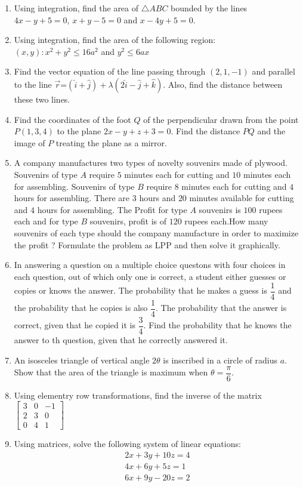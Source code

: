 \documentclass[12pt,-letter paper]{article}
\providecommand{\brak}[1]{\ensuremath{\left(#1\right)}}
\begin{document}
\begin{enumerate}
 \item Using integration, find the area of $\triangle ABC$ bounded by the lines $4x-y+5=0$, $x+y-5=0$ and $x-4y+5=0$.

\item Using integration, find the area of the following region:
       ${(x,y): x^2+y^2\leq 16a^2}$ and ${y^2 \leq 6ax}$	

\item Find the vector equation of the line passing through $\brak{2,1,-1}$ and parallel to the line $\overrightarrow{r}$=$\brak{\hat{i}+\hat{j}}+\lambda\brak{2\hat{i}-\hat{j}+\hat{k}}$. Also, find the distance between these two lines.
	
\item Find the coordinates of the foot $Q$ of the perpendicular drawn from the point $P\brak{1,3,4}$ to the plane $2x-y+z+3=0$. Find the distance $PQ$ and the image of $P$ treating the plane as a mirror.

\item A company manufactures two types of novelty souvenirs made of plywood. Souvenirs of type $A$ require $5$ minutes each for cutting and $10$ minutes each for assembling. Souvenirs of type $B$ require $8$ minutes each for cutting and $4$ hours for assembling. There are $3$ hours and $20$ minutes available for cutting and $4$ hours for assembling. The Profit for type $A$ souvenirs is $100$ rupees each and for type $B$ souvenirs, profit is of $120$ rupees each.How many souvenirs of each type should the company manufacture in order to maximize the profit ? Formulate the problem as LPP and then solve it graphically.

\item In answering a question on a multiple choice questons with four choices in each question, out of which only one is correct, a student either guesses or copies or knows the answer. The probability that he makes a guess is $\dfrac{1}{4}$ and the probability that he copies is also $\dfrac{1}{4}$. The probability that the answer is correct, given that he copied it is $\dfrac{3}{4}$. Find the probability that he knows the answer to th question, given that he correctly answered it.

\item An isosceles triangle of vertical angle $2\theta$ is inscribed in a circle  of radius $a$. Show that the area of the triangle is maximum when $\theta =\dfrac{\pi}{6}$.

\item Using elementry row transformations, find the inverse of the matrix
		$\begin{bmatrix}
			3 & 0 &-1\\
			2 & 3 & 0\\
			0 & 4 &1
		\end{bmatrix}$

\item Using matrices, solve the following system of linear equations:
	\begin{align*}
		2x+3y+10z=4\\
	        4x+6y+5z=1\\
	        6x+9y-20z=2
	\end{align*}
\end{enumerate}
\end{document}
